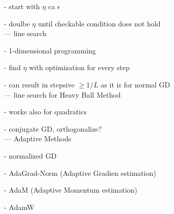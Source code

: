 - start with $\eta$ ca $\epsilon$

- doulbe $\eta$ until checkable condition does not hold
\\

--- line search

- 1-dimensional programming

- find $\eta$ with optimization for every step

- can result in stepsive $\ge 1/L$ as it is for normal GD
\\

--- line search for Heavy Ball Method

- works also for quadratics

- conjugate  GD, orthogonalize?
\\

--- Adaptive Methods

- normalized GD

- AdaGrad-Norm (Adaptive Gradien estimation)

- AdaM (Adaptive Momentum estimation)

- AdamW

